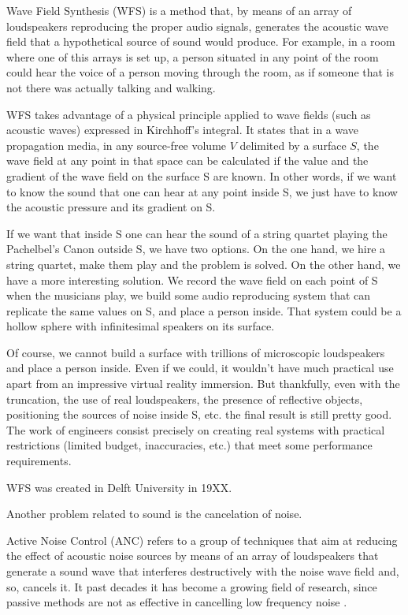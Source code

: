 Wave Field Synthesis (WFS) is a method that, by means of an array of loudspeakers reproducing the proper audio signals, generates the acoustic wave field that a hypothetical source of sound would produce. For example, in a room where one of this arrays is set up, a person situated in any point of the room could hear the voice of a person moving through the room, as if someone that is not there was actually talking and walking.

WFS takes advantage of a physical principle applied to wave fields (such as acoustic waves) expressed in Kirchhoff's integral. It states that in a wave propagation media, in any source-free volume $V$ delimited by a surface $S$, the wave field at any point in that space can be calculated if the value and the gradient of the wave field on the surface S are known. In other words, if we want to know the sound that one can hear at any point inside S, we just have to know the acoustic pressure and its gradient on S.

If we want that inside S one can hear the sound of a string quartet playing the Pachelbel's Canon outside S, we have two options. On the one hand, we hire a string quartet, make them play and the problem is solved. On the other hand, we have a more interesting solution. We record the wave field on each point of S when the musicians play, we build some audio reproducing system that can replicate the same values on S, and place a person inside. That system could be a hollow sphere with infinitesimal speakers on its surface.

Of course, we cannot build a surface with trillions of microscopic loudspeakers and place a person inside. Even if we could, it wouldn't have much practical use apart from an impressive virtual reality immersion. But thankfully, even with the truncation, the use of real loudspeakers, the presence of reflective objects, positioning the sources of noise inside S, etc. the final result is still pretty good. The work of engineers consist precisely on creating real systems with practical restrictions (limited budget, inaccuracies, etc.) that meet some performance requirements.

WFS was created in Delft University in 19XX.

Another problem related to sound is the cancelation of noise. 

Active Noise Control (ANC) refers to a group of techniques that aim at reducing the effect of acoustic noise sources by means of an array of loudspeakers that generate a sound wave that interferes destructively with the noise wave field and, so, cancels it. It past decades it has become a growing field of research, since passive methods are not as effective in cancelling low frequency noise \cite{Lapini2016}.

